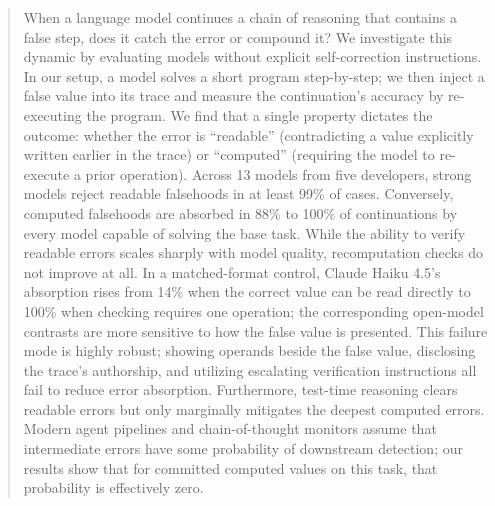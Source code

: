 \begin{abstract}
When a language model continues a chain of reasoning that contains a false step, does it catch the error or compound it? We investigate this dynamic by evaluating models without explicit self-correction instructions. In our setup, a model solves a short program step-by-step; we then inject a false value into its trace and measure the continuation's accuracy by re-executing the program. We find that a single property dictates the outcome: whether the error is ``readable'' (contradicting a value explicitly written earlier in the trace) or ``computed'' (requiring the model to re-execute a prior operation). Across 13 models from five developers, strong models reject readable falsehoods in at least 99\% of cases. Conversely, computed falsehoods are absorbed in 88\% to 100\% of continuations by every model capable of solving the base task. While the ability to verify readable errors scales sharply with model quality, recomputation checks do not improve at all. In a matched-format control, Claude Haiku 4.5's absorption rises from 14\% when the correct value can be read directly to 100\% when checking requires one operation; the corresponding open-model contrasts are more sensitive to how the false value is presented. This failure mode is highly robust; showing operands beside the false value, disclosing the trace's authorship, and utilizing escalating verification instructions all fail to reduce error absorption. Furthermore, test-time reasoning clears readable errors but only marginally mitigates the deepest computed errors. Modern agent pipelines and chain-of-thought monitors assume that intermediate errors have some probability of downstream detection; our results show that for committed computed values on this task, that probability is effectively zero.
\end{abstract}
